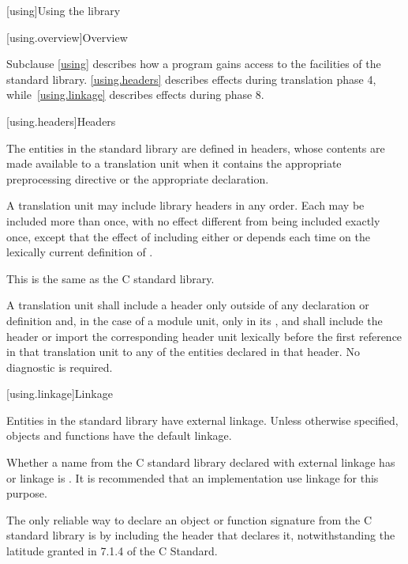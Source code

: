 [using]{Using the library}

[using.overview]{Overview}

\pnum
Subclause \ref{using} describes how a \Cpp{} program gains access to the facilities of the
\Cpp{} standard library. \ref{using.headers} describes effects during translation
phase 4, while~\ref{using.linkage} describes effects during phase
8.

[using.headers]{Headers}

\pnum
The entities in the \Cpp{} standard library are defined in headers,
whose contents are made available to a translation unit when it contains the appropriate
%
%
preprocessing directive
or the appropriate
%
 declaration.

\pnum
A translation unit may include library headers in any order.
%
Each may be included more than once, with no effect different from
being included exactly once, except that the effect of including either
 or 
depends each time on the lexically current definition of
%
%
.
\begin{footnote}
This is the same as the C standard library.
\end{footnote}

\pnum
A translation unit shall include a header only outside of any
%
declaration or definition and,
in the case of a module unit,
only in its , and
shall include the header or import the corresponding header unit lexically
before the first reference in that translation unit to any of the entities
declared in that header. No diagnostic is required.

[using.linkage]{Linkage}

\pnum
Entities in the \Cpp{} standard library have external linkage.
Unless otherwise specified, objects and functions have the default
linkage.

\pnum
{}%
Whether a name from the C standard library declared with
external linkage has
%
%
%
or
%
linkage is . It is recommended that an
implementation use
linkage for this purpose.
\begin{footnote}
The only reliable way to declare an object or
function signature from the C standard library is by including the header that
declares it, notwithstanding the latitude granted in 7.1.4 of the C
Standard.
\end{footnote}

